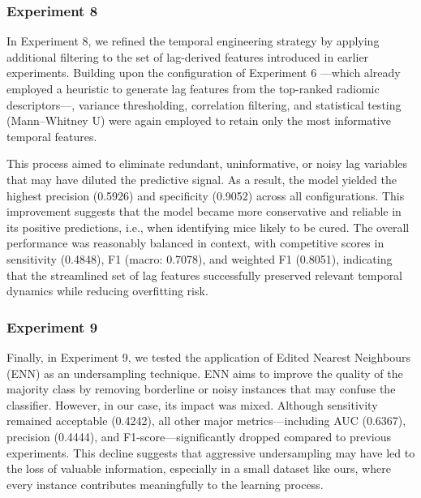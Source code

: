 \documentclass[12pt, a4paper]{report}
\begin{document}
\subsubsection{Experiment 8}

In Experiment 8, we refined the temporal engineering strategy by applying additional filtering to the set of lag-derived features introduced in earlier experiments. Building upon the configuration of Experiment 6 —which already employed a heuristic to generate lag features from the top-ranked radiomic descriptors—, variance thresholding, correlation filtering, and statistical testing (Mann–Whitney U) were again employed to retain only the most informative temporal features.

This process aimed to eliminate redundant, uninformative, or noisy lag variables that may have diluted the predictive signal. As a result, the model yielded the highest precision (0.5926) and specificity (0.9052) across all configurations. This improvement suggests that the model became more conservative and reliable in its positive predictions, i.e., when identifying mice likely to be cured. The overall performance was reasonably balanced in context, with competitive scores in sensitivity (0.4848), F1 (macro: 0.7078), and weighted F1 (0.8051), indicating that the streamlined set of lag features successfully preserved relevant temporal dynamics while reducing overfitting risk.

\begin{table}[H]
\centering
\renewcommand{\arraystretch}{1.5} %
\normalsize %
\caption{Configuration 8 – Final model with filtered lag features (low variance, high correlation, and non-significance removed).}
\end{table}

\subsubsection{Experiment 9}
Finally, in Experiment 9, we tested the application of Edited Nearest Neighbours (ENN) as an undersampling technique. ENN aims to improve the quality of the majority class by removing borderline or noisy instances that may confuse the classifier. However, in our case, its impact was mixed. Although sensitivity remained acceptable (0.4242), all other major metrics—including AUC (0.6367), precision (0.4444), and F1-score—significantly dropped compared to previous experiments. This decline suggests that aggressive undersampling may have led to the loss of valuable information, especially in a small dataset like ours, where every instance contributes meaningfully to the learning process.
\end{document}
